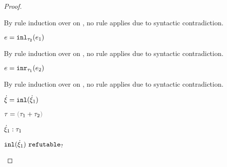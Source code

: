 \begin{proof}
\begin{byCases}
\begin{byCases}
\begin{byCases}
\begin{pfsteps*}
        \end{pfsteps*} 
        By rule induction over  on , no rule applies due to syntactic contradiction.
        \item[\text{(\ref{rule:IInl})}] 
        \begin{pfsteps*}
        \item $e=\mathtt{inl}_{\tau_2}({e_1})$ 
        \end{pfsteps*} 
        By rule induction over  on , no rule applies due to syntactic contradiction.
        \item[\text{(\ref{rule:IInr})}] 
        \begin{pfsteps*}
        \item $e=\mathtt{inr}_{\tau_1}({e_2})$ 
        \end{pfsteps*} 
        By rule induction over  on , no rule applies due to syntactic contradiction.
      \end{byCases}
    \end{byCases}
    \item[\text{(\ref{rule:CTInl})}]
    \begin{pfsteps*}
      \item $\dot{\xi} = \mathtt{inl}(\dot{\xi}_1)$ 
      \item $\tau = \tsum{\tau_1}{\tau_2}$ 
      \item $\dot{\xi}_1 : \tau_1$  
      \item $\mathtt{inl}(\dot{\xi}_1) ~\mathtt{refutable}_?$  
      \end{pfsteps*}


\end{byCases}
\end{proof}
